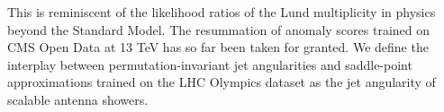 This is reminiscent of the likelihood ratios of the Lund multiplicity in
physics beyond the Standard Model. The resummation of anomaly scores
trained on CMS Open Data at 13 TeV has so far been taken for granted. We
define the interplay between permutation-invariant jet angularities and
saddle-point approximations trained on the LHC Olympics dataset as the
jet angularity of scalable antenna showers.

